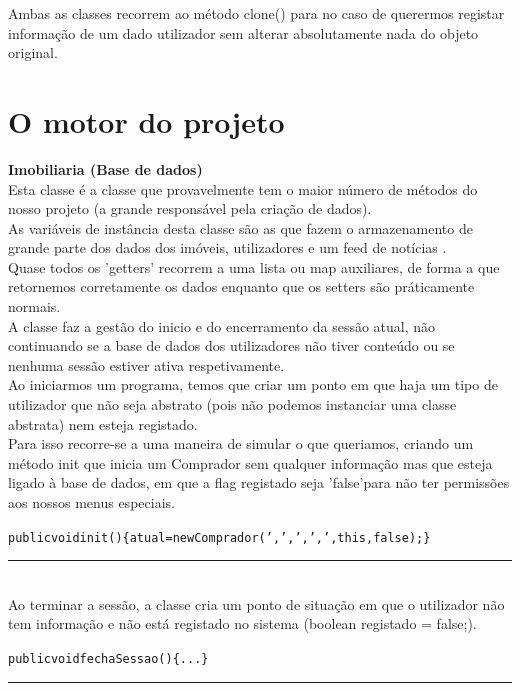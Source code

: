 \documentclass[12pt]{article}
\newenvironment{code}                    
{\textbf{
} \hspace{1cm} \hrulefill \\ 
\smallskip 
\begin{center}
\begin{minipage}{0.9\textwidth} 
\begin{alltt}\small}
{\end{alltt}
\end{minipage}
\end{center}
\hrule\smallskip
}
\begin{document}
Ambas as classes recorrem ao método clone() para no caso de querermos registar informação de um dado utilizador sem alterar absolutamente nada do objeto original.


\pagebreak

\section{O motor do projeto}

\textbf{Imobiliaria (Base de dados)}
\\

Esta classe é a classe que provavelmente tem o maior número de métodos do nosso projeto (a grande responsável pela criação de dados).
\\

As variáveis de instância desta classe são as que fazem o armazenamento de grande parte dos dados dos imóveis, utilizadores e um feed de notícias . 
\\

Quase todos os 'getters' recorrem a uma lista ou map auxiliares, de forma a que retornemos corretamente os dados enquanto que os setters são práticamente normais.
\\

A classe faz a gestão do inicio e do encerramento da sessão atual, não continuando se a base de dados dos utilizadores não tiver conteúdo ou se nenhuma sessão estiver ativa respetivamente.
\\

Ao iniciarmos um programa, temos que criar um ponto em que haja um tipo de utilizador que não seja abstrato (pois não podemos instanciar uma classe abstrata) nem esteja registado.\\

Para isso recorre-se a uma maneira de simular o que queriamos, criando um método init que inicia um Comprador sem qualquer informação mas que esteja ligado à base de dados, em que a flag registado seja 'false'para não ter permissões aos nossos menus especiais.
\newline
\begin{code}
   public void init()\{atual = new Comprador (',',',',',this,false);\}
\end{code}
~\\

Ao terminar a sessão, a classe cria um ponto de situação em que o utilizador não tem informação e não está registado no sistema (boolean registado = false;).
\newline
\begin{code}
public void fechaSessao()\{... \}
\end{code}
~\\
\end{document}
